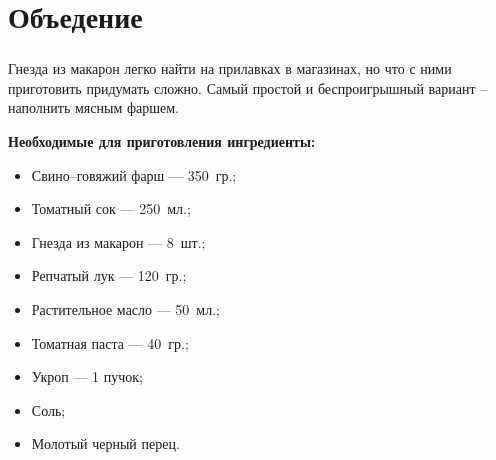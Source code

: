 \documentclass[t]{beamer}  %
\begin{document}
\section{Объедение} 
\begin{frame} %
	\frametitle{\insertsection}
	Гнезда из макарон легко найти на прилавках в магазинах, но что с ними приготовить придумать сложно. Самый простой и беспроигрышный вариант – наполнить мясным фаршем. \pause
	
	\textbf{Необходимые для приготовления ингредиенты:}
	\begin{multicols}{2}
		\begin{itemize}
			\item Свино--говяжий фарш --- 350~гр.;
			\item Томатный сок --- 250~мл.;
			\item Гнезда из макарон --- 8~шт.;
			\item Репчатый лук --- 120~гр.;
			\item Растительное масло --- 50~мл.;
			\item Томатная паста --- 40~гр.;
			\item Укроп --- 1 пучок;
			\item Соль;
			\item Молотый черный перец.
		\end{itemize}	
	\end{multicols}
\end{frame}	
\end{document}
